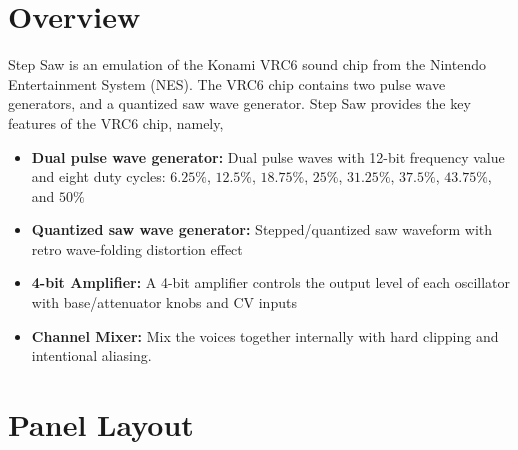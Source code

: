 \documentclass[12pt,letter]{article}
\begin{document}


\section*{Overview}

Step Saw is an emulation of the Konami VRC6 sound chip from the Nintendo Entertainment System (NES). The VRC6 chip contains two pulse wave generators, and a quantized saw wave generator. Step Saw provides the key features of the VRC6 chip, namely,
\begin{itemize}
  \item \textbf{Dual pulse wave generator:} Dual pulse waves with 12-bit frequency value and eight duty cycles: $6.25\%$, $12.5\%$, $18.75\%$, $25\%$, $31.25\%$, $37.5\%$, $43.75\%$, and $50\%$
  \item \textbf{Quantized saw wave generator:} Stepped/quantized saw waveform with retro wave-folding distortion effect
  \item \textbf{4-bit Amplifier:} A 4-bit amplifier controls the output level of each oscillator with base/attenuator knobs and CV inputs
  \item \textbf{Channel Mixer:} Mix the voices together internally with hard clipping and intentional aliasing.
\end{itemize}


\clearpage
\section*{Panel Layout}
\end{document}
